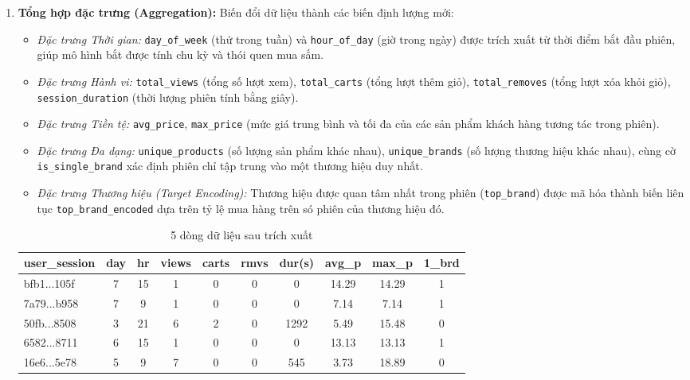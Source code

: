 \documentclass[a4paper,11pt]{article}
\begin{document}
\begin{enumerate}[itemsep=4pt, leftmargin=*]
    \item \textbf{Tổng hợp đặc trưng (Aggregation):} Biến đổi dữ liệu thành các biến định lượng mới:
    \begin{itemize}
        \item \textit{Đặc trưng Thời gian:} \texttt{day\_of\_week} (thứ trong tuần) và \texttt{hour\_of\_day} (giờ trong ngày) được trích xuất từ thời điểm bắt đầu phiên, giúp mô hình bắt được tính chu kỳ và thói quen mua sắm.
        \item \textit{Đặc trưng Hành vi:} \texttt{total\_views} (tổng số lượt xem), \texttt{total\_carts} (tổng lượt thêm giỏ), \texttt{total\_removes} (tổng lượt xóa khỏi giỏ), \\\texttt{session\_duration} (thời lượng phiên tính bằng giây).
        \item \textit{Đặc trưng Tiền tệ:} \texttt{avg\_price}, \texttt{max\_price} (mức giá trung bình và tối đa của các sản phẩm khách hàng tương tác trong phiên).
                \item \textit{Đặc trưng Đa dạng:} \texttt{unique\_products} (số lượng sản phẩm khác nhau), \texttt{unique\_brands} (số lượng thương hiệu khác nhau), cùng cờ \texttt{is\_single\_brand} xác định phiên chỉ tập trung vào một thương hiệu duy nhất.
        \item \textit{Đặc trưng Thương hiệu (Target Encoding):} Thương hiệu được quan tâm nhất trong phiên (\texttt{top\_brand}) được mã hóa thành biến liên tục \texttt{top\_brand\_encoded} dựa trên tỷ lệ mua hàng trên só phiên của thương hiệu đó.
    \end{itemize}
\begin{table}[H]
    \centering
    \caption{5 dòng dữ liệu sau trích xuất }
    \label{tab:session_features_1}
    \begin{tabular}{l cccc cccc c}
        \toprule
        \textbf{user\_session} & \textbf{day} & \textbf{hr} & \textbf{views} & \textbf{carts} & \textbf{rmvs} & \textbf{dur(s)} & \textbf{avg\_p} & \textbf{max\_p} & \textbf{1\_brd} \\
        \midrule
        bfb1...105f & 7 & 15 & 1 & 0 & 0 & 0    & 14.29 & 14.29 & 1 \\
        7a79...b958 & 7 & 9  & 1 & 0 & 0 & 0    & 7.14  & 7.14  & 1 \\
        50fb...8508 & 3 & 21 & 6 & 2 & 0 & 1292 & 5.49  & 15.48 & 0 \\
        6582...8711 & 6 & 15 & 1 & 0 & 0 & 0    & 13.13 & 13.13 & 1 \\
        16e6...5e78 & 5 & 9  & 7 & 0 & 0 & 545  & 3.73  & 18.89 & 0 \\
        \bottomrule
    \end{tabular}
    

\end{table}
\end{enumerate}
\end{document}
